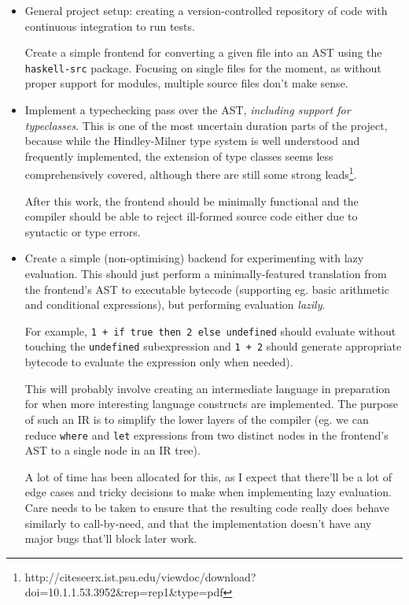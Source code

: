 \documentclass[12pt]{article}
\newcommand\haskell[1]{\texttt{#1}}
\newcommand\monospace[1]{\texttt{#1}}
\begin{document}
\begin{itemize}
\item
{

    General project setup: creating a version-controlled repository of code with continuous integration to run tests.

    Create a simple frontend for converting a given file into an AST using the \monospace{haskell-src} package. Focusing
    on single files for the moment, as without proper support for modules, multiple source files don't make sense.

}
\item
{

    Implement a typechecking pass over the AST, \textit{including support for typeclasses}. This is one of the most
    uncertain duration parts of the project, because while the Hindley-Milner type system is well understood and
    frequently implemented, the extension of type classes seems less comprehensively covered, although there are still
    some strong leads\footnote{http://citeseerx.ist.psu.edu/viewdoc/download?doi=10.1.1.53.3952\&rep=rep1\&type=pdf}.

    After this work, the frontend should be minimally functional and the compiler should be able to reject ill-formed
    source code either due to syntactic or type errors.

}
\item
{

    Create a simple (non-optimising) backend for experimenting with lazy evaluation. This should just perform a
    minimally-featured translation from the frontend's AST to executable bytecode (supporting eg. basic arithmetic and
    conditional expressions), but performing evaluation \textit{lazily}.

    For example, \haskell{1 + if true then 2 else undefined} should evaluate without touching the \haskell{undefined}
    subexpression and \haskell{1 + 2} should generate appropriate bytecode to evaluate the expression only when needed).
    
    This will probably involve creating an intermediate language in preparation for when more interesting language
    constructs are implemented. The purpose of such an IR is to simplify the lower layers of the compiler (eg. we can
    reduce \haskell{where} and \haskell{let} expressions from two distinct nodes in the frontend's AST to a single node
    in an IR tree).

    A lot of time has been allocated for this, as I expect that there'll be a lot of edge cases and tricky decisions to
    make when implementing lazy evaluation. Care needs to be taken to ensure that the resulting code really does behave
    similarly to call-by-need, and that the implementation doesn't have any major bugs that'll block later work.

}
\end{itemize}
\end{document}
